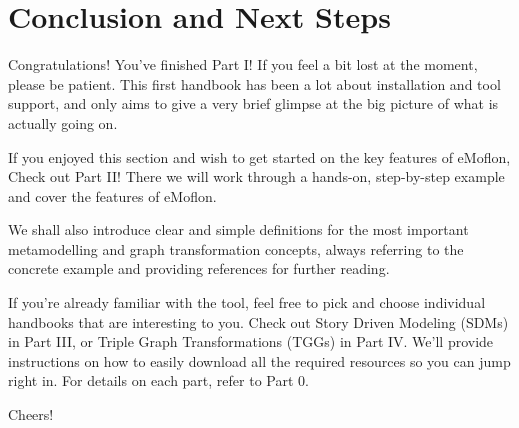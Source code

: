\newpage \genHeader

\vspace*{2cm}

\section{Conclusion and Next Steps}
\vspace{0.5cm}

Congratulations!\hypertarget{conclusion}{} You've finished Part I! If you feel a bit lost at the moment, please be patient. This first handbook has been a lot
about installation and tool support, and only aims to give a very brief glimpse at the big picture of what is actually going on.

If you enjoyed this section and wish to get started on the key features of eMoflon, Check out Part II! There we will work through a hands-on, step-by-step
example and cover the features of eMoflon.

We shall also introduce clear and simple definitions for the most important metamodelling and graph transformation concepts, always referring to the concrete
example and providing references for further reading.

If you're already familiar with the tool, feel free to pick and choose individual handbooks that are interesting to you. Check out Story Driven Modeling (SDMs)
in Part III, or Triple Graph Transformations (TGGs) in Part IV. We'll provide instructions on how to easily download all the required resources so you can jump
right in. For details on each part, refer to Part 0.

Cheers!